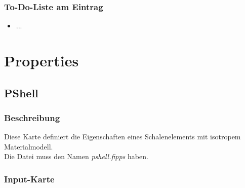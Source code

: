 \documentclass[11pt,titlepage,listof=totoc,bibliography=totoc,twoside]{scrreprt}
\begin{document}
{{\subsubsection{To-Do-Liste am Eintrag}

\begin{itemize}
\item ...
\end{itemize}

\newpage

\section{Properties}

\subsection{PShell}

\subsubsection{Beschreibung}

Diese Karte definiert die Eigenschaften eines Schalenelements mit isotropem Materialmodell.\\
Die Datei muss den Namen \emph{pshell.fipps} haben.

\subsubsection{Input-Karte}

}}
\end{document}
